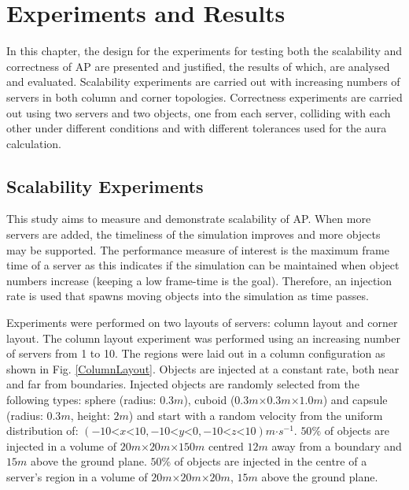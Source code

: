 \chapter{Experiments and Results}\label{Results}
In this chapter, the design for the experiments for testing both the scalability and correctness of AP are presented and justified, the results of which, are analysed and evaluated. Scalability experiments are carried out with increasing numbers of servers in both column and corner topologies. Correctness experiments are carried out using two servers and two objects, one from each server, colliding with each other under different conditions and with different tolerances used for the aura calculation.

\section{Scalability Experiments}
This study aims to measure and demonstrate scalability of AP. When more servers are added, the timeliness of the simulation improves and more objects may be supported. The performance measure of interest is the maximum frame time of a server as this indicates if the simulation can be maintained when object numbers increase (keeping a low frame-time is the goal). Therefore, an injection rate is used that spawns moving objects into the simulation as time passes.

Experiments were performed on two layouts of servers: column layout and corner layout. The column layout experiment was performed using an increasing number of servers from 1 to 10. The regions were laid out in a column configuration as shown in Fig. \ref{ColumnLayout}. Objects are injected at a constant rate, both near and far from boundaries. Injected objects are randomly selected from the following types: sphere (radius: $0.3m$), cuboid ($0.3m\mathord{\times}0.3m\mathord{\times}1.0m$) and capsule (radius: $0.3m$, height: $2m$) and start with a random velocity from the uniform distribution of: $(-10\mathord{<}x\mathord{<}10,-10\mathord{<}y\mathord{<}0,-10\mathord{<}z\mathord{<}10)m\mathord{\cdot}s^{-1}$. $50\%$ of objects are injected in a volume of $20m\mathord{\times}20m\mathord{\times}150m$ centred $12m$ away from a boundary and $15m$ above the ground plane. $50\%$ of objects are injected in the centre of a server's region in a volume of $20m\mathord{\times}20m\mathord{\times}20m$, $15m$ above the ground plane.

